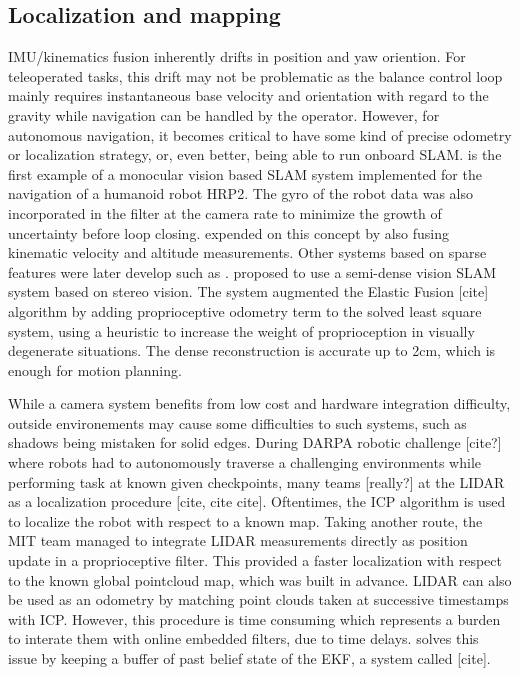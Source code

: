 \subsection{Localization and mapping}
IMU/kinematics fusion inherently drifts in position and yaw oriention. For teleoperated tasks, this drift may not be problematic as the balance control loop
mainly requires instantaneous base velocity and orientation with regard to the gravity while navigation can be handled by the operator. However, for autonomous
navigation, it becomes critical to have some kind of precise odometry or localization strategy, or, even better, being able to run onboard SLAM. 
\cite{davison2007monoslam} is the first example of a monocular vision based SLAM system implemented for the navigation of a humanoid robot HRP2. The gyro of the robot data
was also incorporated in the filter at the camera rate to minimize the growth of uncertainty before loop closing. \cite{stasse2006real} expended on this concept by also fusing
kinematic velocity and altitude measurements. Other systems based on sparse features were later develop such as \cite{ahn2012board, oriolo2012vision, oriolo2016humanoid, kwak20093d}.
\cite{scona2017direct} proposed to use a semi-dense vision SLAM system based on stereo vision. The system augmented the Elastic Fusion [cite] algorithm by adding 
proprioceptive odometry term to the solved least square system, using a heuristic to increase the weight of proprioception in visually degenerate situations. The 
dense reconstruction is accurate up to 2cm, which is enough for motion planning. 

While a camera system benefits from low cost and hardware integration difficulty, outside environements 
may cause some difficulties to such systems, such as shadows being mistaken for solid edges.
During DARPA robotic challenge [cite?] where robots had to autonomously traverse a challenging environments while performing task at known given checkpoints, 
many teams [really?] at the LIDAR as a localization procedure [cite, cite cite]. Oftentimes, the ICP algorithm is used to localize the robot 
with respect to a known map. Taking another route, the MIT team \cite{fallon2014drift} managed to integrate LIDAR measurements directly as position update in a proprioceptive
filter. This provided a faster localization with respect to the known global pointcloud map, which was built in advance. 
LIDAR can also be used as an odometry by matching point clouds taken at successive timestamps with ICP. However, this procedure is time consuming 
which represents a burden to interate them with online embedded filters, due to time delays. \cite{nobili2017heterogeneous} solves this issue by keeping a
buffer of past belief state of the EKF, a system called [cite].






